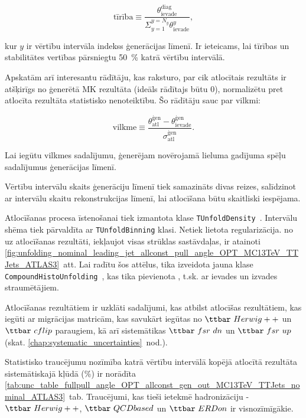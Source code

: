 \begin{equation}
  \text{tīrība}\equiv\frac{\theta^{\text{diag}}_{\text{ievade}}}{\Sigma_{y=1}^{y=N_{y}}\theta^{y}_{\text{ievade}}},
\end{equation}

\noindent kur $y$ ir vērtību intervāla indekss ģenerācijas līmenī. Ir ieteicams, lai tīrības un stabilitātes vertības pārsniegtu 50~\% katrā vērtību intervālā.

Apskatām arī interesantu rādītāju, kas raksturo, par cik atlocītais rezultāts ir atšķirīgs no ģenerētā MK rezultāta (ideāls rādītajs būtu 0), normalizētu pret atlocīta rezultāta statistisko nenoteiktību. Šo rādītāju sauc par vilkmi:

\begin{equation}
  \text{vilkme}\equiv\frac{\theta^{\text{ģen}}_{\text{atl}}-\theta^{\text{ģen}}_{\text{ievade}}}{\sigma^{\text{ģen}}_{\text{atl}}}.
\end{equation}

Lai iegūtu vilkmes sadalījumu, ģenerējam novērojamā lieluma gadījuma spēļu sadalījumus ģenerācijas līmenī.

Vērtību intervālu skaits ģenerāciju līmenī tiek samazināts divas reizes, salīdzinot ar intervālu skaitu rekonstrukcijas līmenī, lai atlocīšana būtu skaitliski iespējama.

Atlocīšanas procesa īstenošanai tiek izmantota \ROOT klase \lstinline[language=sh]|TUnfoldDensity|~\cite{Schmitt:2012kp}. Intervālu shēma tiek pārvaldīta ar \lstinline[language=sh]|TUnfoldBinning| klasi. Netiek lietota regularizācija. \pullangle no \leadingjet uz \scndleadingjet atlocīšanas rezultāti, iekļaujot visas strūklas sastāvdaļas, ir atainoti \ref{fig:unfolding_nominal_leading_jet_allconst_pull_angle_OPT_MC13TeV_TTJets_ATLAS3}~att. Lai radītu šos attēlus, tika izveidota jauna klase \lstinline[language=sh]|CompoundHistoUnfolding|~\cite{url:compoundhistounfolding}, kas tika pievienota \ROOT, t.sk. ar ievades un izvades straumētājiem.

Atlocīšanas rezultātiem ir uzklāti sadalījumi, kas atbilst atlocīšas rezultātiem, kas iegūti ar migrācijas matricām, kas savukārt iegūtas no $\ttbar\ Herwig++$ un $\ttbar\ cflip$ paraugiem, kā arī sistemātikas $\ttbar\ fsr\ dn$ un $\ttbar\ fsr\ up$ (skat. \ref{chap:systematic_uncertainties}~nod.).

Statistisko \gls{traucējumu} nozīmība katrā vērtību intervālā kopējā atlocītā rezultāta sistemātiskajā kļūdā  (\%) ir norādīta \ref{tab:unc_table_fullpull_angle_OPT_allconst_gen_out_MC13TeV_TTJets_nominal_ATLAS3}~tab. Traucējumi, kas tieši ietekmē hadronizāciju - $\ttbar\ Herwig++$, $\ttbar\ QCDbased$ un $\ttbar\ ERDon$ ir visnozīmīgākie.

